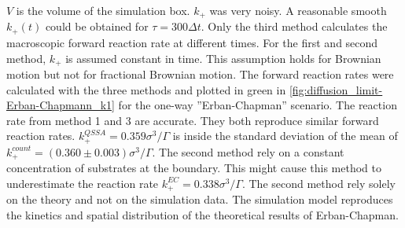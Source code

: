 \documentclass[
  a4paper,BCOR10mm,twoside,
  headsepline,footsepline,%
  fleqn,openbib
]{scrbook}
\begin{document}
$V$ is the volume of the simulation box. $k_+$ was very noisy. A reasonable smooth $k_+(t)$ could be obtained for $\tau=300 \Delta t$. Only the third method calculates the macroscopic forward reaction rate at different times. For the first and second method, $k_{+}$ is assumed constant in time. This assumption holds for Brownian motion but not for fractional Brownian motion. The forward reaction rates were calculated with the three methods and plotted in green in \cref{fig:diffusion_limit-Erban-Chapmann_k1} for the one-way ”Erban-Chapman” scenario. The reaction rate from method 1 and 3 are accurate. They both reproduce similar forward reaction rates. $k^{QSSA}_{+}=0.359 \sigma^3/\Gamma$ is inside the standard deviation of the mean of  $k^{count}_+=(0.360\pm0.003)\sigma^3/\Gamma$. The second method rely on a constant concentration of substrates at the boundary. This might cause this method to underestimate the reaction rate $k^{EC}_{+}=0.338 \sigma^3/\Gamma$. The second method rely solely on the theory and not on the simulation data. The simulation model reproduces the kinetics and spatial distribution of the theoretical results of Erban-Chapman.
\end{document}
